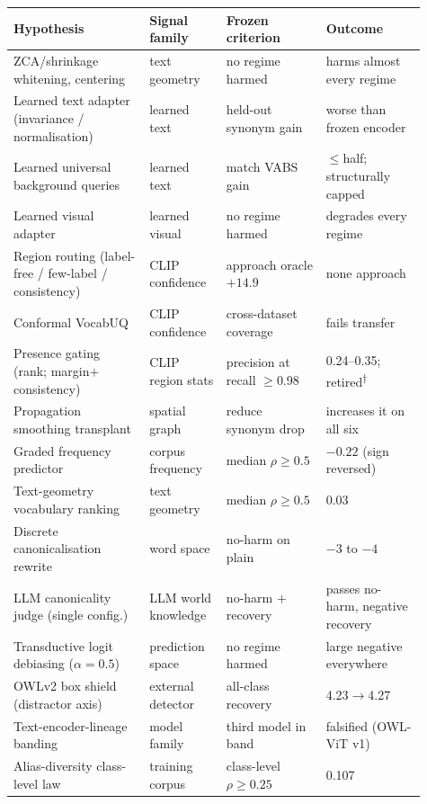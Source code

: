 \documentclass[11pt]{article}
\begin{document}
\begin{table}[t]
\centering\scriptsize
\begin{tabular}{p{0.30\linewidth}p{0.17\linewidth}p{0.22\linewidth}p{0.22\linewidth}}
\toprule
Hypothesis & Signal family & Frozen criterion & Outcome \\
\midrule
ZCA/shrinkage whitening, centering & text geometry & no regime harmed & harms almost every regime \\
Learned text adapter (invariance / normalisation) & learned text & held-out synonym gain & worse than frozen encoder \\
Learned universal background queries & learned text & match VABS gain & $\le$half; structurally capped \\
Learned visual adapter & learned visual & no regime harmed & degrades every regime \\
Region routing (label-free / few-label / consistency) & CLIP confidence & approach oracle $+14.9$ & none approach \\
Conformal VocabUQ & CLIP confidence & cross-dataset coverage & fails transfer \\
Presence gating (rank; margin$+$consistency) & CLIP region stats & precision at recall $\ge$0.98 & 0.24--0.35; retired\textsuperscript{$\dagger$} \\
Propagation smoothing transplant & spatial graph & reduce synonym drop & increases it on all six \\
Graded frequency predictor & corpus frequency & median $\rho\ge0.5$ & $-0.22$ (sign reversed) \\
Text-geometry vocabulary ranking & text geometry & median $\rho\ge0.5$ & 0.03 \\
Discrete canonicalisation rewrite & word space & no-harm on plain & $-3$ to $-4$ \\
LLM canonicality judge (single config.) & LLM world knowledge & no-harm $+$ recovery & passes no-harm, negative recovery \\
Transductive logit debiasing ($\alpha{=}0.5$) & prediction space & no regime harmed & large negative everywhere \\
OWLv2 box shield (distractor axis) & external detector & all-class recovery & 4.23$\to$4.27 \\
Text-encoder-lineage banding & model family & third model in band & falsified (OWL-ViT v1) \\
Alias-diversity class-level law & training corpus & class-level $\rho\ge0.25$ & 0.107 \\

\end{tabular}
\end{table}
\end{document}
